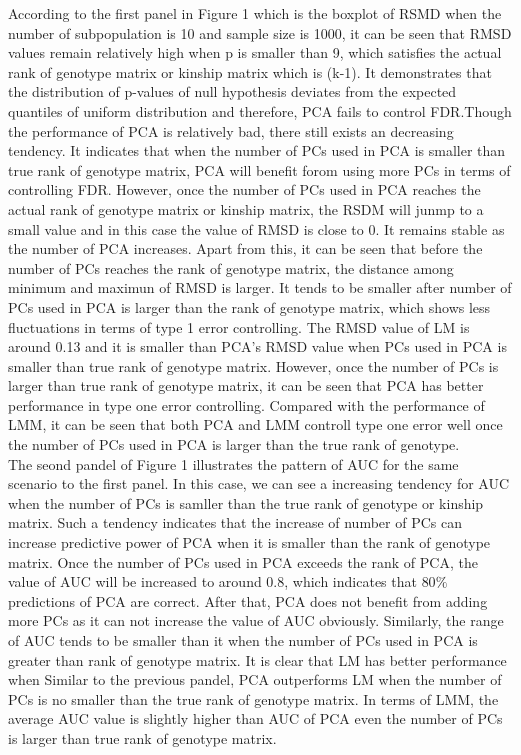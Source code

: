 \documentclass[12pt]{article}
\begin{document}
According to the first panel in Figure 1 which is the boxplot of RSMD when the number of subpopulation is 10 and sample size is 1000, it can be seen that RMSD values remain relatively high when p is smaller than 9, which satisfies the actual rank of genotype matrix or kinship matrix which is (k-1). It demonstrates that the distribution of p-values of null hypothesis deviates from the expected quantiles of uniform distribution and therefore, PCA fails to control FDR.Though the performance of PCA is relatively bad, there still exists an decreasing tendency. It indicates that when the number of PCs used in PCA is smaller than true rank of genotype matrix, PCA will benefit forom using more PCs in terms of controlling FDR. However, once the number of PCs used in PCA reaches the actual rank of genotype matrix or kinship matrix, the RSDM will junmp to a small value and in this case the value of RMSD is close to 0. It remains stable as the number of PCA increases. Apart from this, it can be seen that before the number of PCs reaches the rank of genotype matrix, the distance among minimum and maximun of RMSD is larger. It tends to be smaller after number of PCs used in PCA is larger than the rank of genotype matrix, which shows less fluctuations in terms of type 1 error controlling. The RMSD value of LM is around 0.13 and it is smaller than PCA's RMSD value when PCs used in PCA is smaller than true rank of genotype matrix. However, once the number of PCs is larger than true rank of genotype matrix, it can be seen that PCA has better performance in type one error controlling. Compared with the performance of LMM, it can be seen that both PCA and LMM controll type one error well once the number of PCs used in PCA is larger than the true rank of genotype.\\

The seond pandel of Figure 1 illustrates the pattern of AUC for the same scenario to the first panel. In this case, we can see a increasing tendency for AUC when the number of PCs is samller than the true rank of genotype or kinship matrix. Such a tendency indicates that the increase of number of PCs can increase predictive power of PCA when it is smaller than the rank of genotype matrix. Once the number of PCs used in PCA exceeds the rank of PCA, the value of AUC will be increased to around 0.8, which indicates that $80\%$ predictions of PCA are correct. After that, PCA does not benefit from adding more PCs as it can not increase the value of AUC obviously. Similarly, the range of AUC tends to be smaller than it when the number of PCs used in PCA is greater than rank of genotype matrix. It is clear that LM has better performance when  Similar to the previous pandel, PCA outperforms LM when the number of PCs is no smaller than the true rank of genotype matrix. In terms of LMM, the average AUC value is slightly higher than AUC of PCA even the number of PCs is larger than true rank of genotype matrix. \\
\end{document}
